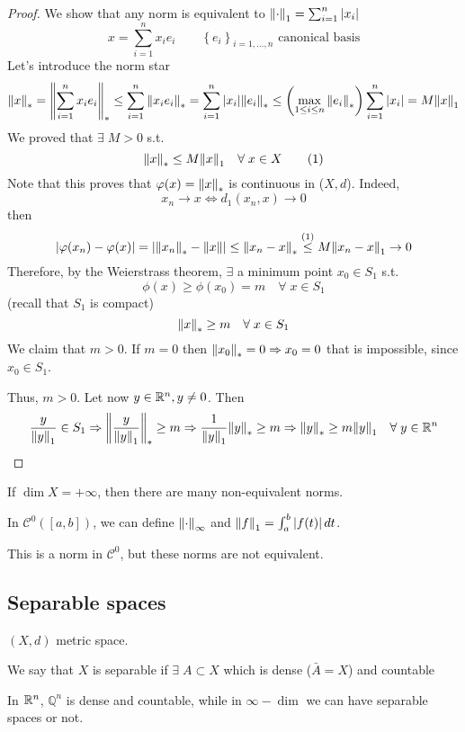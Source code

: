 \begin{proof}
    We show that any norm is equivalent to \(\norm{\cdot}_1 = \sum_{i=1}^n \abs{x_i}\)
    \[
        x = \sum_{i=1}^n x_i e_i \qquad \left\{ e_i \right\}_{i= 1,\ldots, n} \mbox{ canonical basis}
    \]
    Let's introduce the norm star 
    \[
        \norm{x}_* = \norm{\sum_{i=1}^n x_i e_i}_* 
        \leq \sum_{i=1}^n \norm{x_i e_i}_* = \sum_{i=1}^n \abs{x_i} \norm{e_i}_* 
        \leq \left(\max_{1 \leq i \leq n} \norm{e_i}_*\right) \sum_{i=1}^n \abs{x_i}
        = M \norm{x}_1
    \]
    We proved that \(\exists \; M> 0\) s.t.
    \[
        \norm{x}_* \leq M \norm{x}_1 \quad \forall \; x \in X \tag{1}
    \]
    Note that this proves that \(\varphi(x) = \norm{x}_*\) is continuous in (\(X, d\)). Indeed, 
    \[
        x_n \to x \Leftrightarrow d_1(x_n, x) \to 0
    \]
    then 
    \[
        \abs{\varphi(x_n) - \varphi(x)} = \abs{\norm{x_n}_* -\norm{x}} \leq \norm{x_n - x}_* 
        \overset{(1)}{\leq} M\norm{x_n - x}_1 \to 0
    \]
    Therefore, by the Weierstrass theorem, \(\exists\) a minimum point \(x_0 \in S_1\) s.t. 
    \[
        \phi(x) \geq \phi(x_0) = m \quad \forall\; x \in S_1
    \]
    (recall that \(S_1\) is compact)
    \[
        \norm{x}_* \geq m \quad \forall \; x \in S_1
    \]
    We claim that \(m>0\). If \(m=0\) then \(\norm{x_0}_* = 0 \Rightarrow x_0  = 0\) that is impossible, since \(x_0 \in S_1\).

    Thus, \(m>0\). Let now \(y \in \mathbb{R}^n, y \neq 0\). Then 
    \[
        \frac{y}{\norm{y}_1} \in S_1 
        \Rightarrow \norm{\frac{y}{\norm{y}_1}}_* \geq m 
        \Rightarrow \frac{1}{\norm{y}_1} \norm{y}_* \geq m 
        \Rightarrow \norm{y}_* \geq m \norm{y}_1 \quad \forall \; y \in \mathbb{R}^n 
    \]
\end{proof}
If \(\dim X = +\infty\), then there are many non-equivalent norms.

\begin{example}
    In \(\mathcal{C}^0([a,b])\), we can define \(\norm{\cdot}_{\infty}\) and \(\norm{f}_1 = \int_a^b\abs{f(t)} \, dt\).
\end{example}
This is a norm in \(\mathcal{C}^0\), but these norms are not equivalent. 

\subsection{Separable spaces}
\((X, d)\) metric space. 
\begin{definition}
    We say that \(X\) is separable if \(\exists \; A \subset X\) which is dense (\(\bar{A} = X\)) and countable 
\end{definition}
In \(\mathbb{R}^n\), \(\mathbb{Q}^n\) is dense and countable, while in \(\infty-\dim\) we can have separable spaces or not. 
